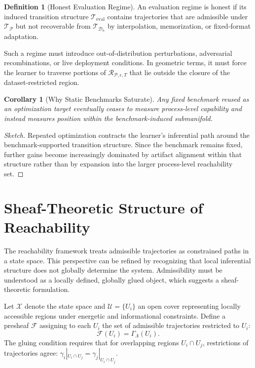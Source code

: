 \documentclass[12pt]{article}
\theoremstyle{plain}
\newtheorem{corollary}[theorem]{Corollary}
\theoremstyle{definition}
\newtheorem{definition}[theorem]{Definition}
\theoremstyle{remark}
\begin{document}
\begin{definition}[Honest Evaluation Regime]
An evaluation regime is honest if its induced transition structure $\mathcal{T}_{\mathrm{eval}}$ contains trajectories that are admissible under $\mathcal{T}_{\mathcal{P}}$ but not recoverable from $\mathcal{T}_{\mathcal{D}_n}$ by interpolation, memorization, or fixed-format adaptation.
\end{definition}

Such a regime must introduce out-of-distribution perturbations, adversarial recombinations, or live deployment conditions. In geometric terms, it must force the learner to traverse portions of $\mathcal{R}_{\mathcal{P},\epsilon,T}$ that lie outside the closure of the dataset-restricted region.

\begin{corollary}[Why Static Benchmarks Saturate]
Any fixed benchmark reused as an optimization target eventually ceases to measure process-level capability and instead measures position within the benchmark-induced submanifold.
\end{corollary}

\begin{proof}[Sketch]
Repeated optimization contracts the learner's inferential path around the benchmark-supported transition structure. Since the benchmark remains fixed, further gains become increasingly dominated by artifact alignment within that structure rather than by expansion into the larger process-level reachability set.
\end{proof}

\section{Sheaf-Theoretic Structure of Reachability}

The reachability framework treats admissible trajectories as constrained paths in a state space. This perspective can be refined by recognizing that local inferential structure does not globally determine the system. Admissibility must be understood as a locally defined, globally glued object, which suggests a sheaf-theoretic formulation.

Let $\mathcal{X}$ denote the state space and $\mathcal{U} = \{U_i\}$ an open cover representing locally accessible regions under energetic and informational constraints. Define a presheaf $\mathcal{F}$ assigning to each $U_i$ the set of admissible trajectories restricted to $U_i$:
\[
\mathcal{F}(U_i) = \Gamma_{\Lambda}(U_i).
\]
The gluing condition requires that for overlapping regions $U_i \cap U_j$, restrictions of trajectories agree: $\gamma_i|_{U_i \cap U_j} = \gamma_j|_{U_i \cap U_j}$.
\end{document}
